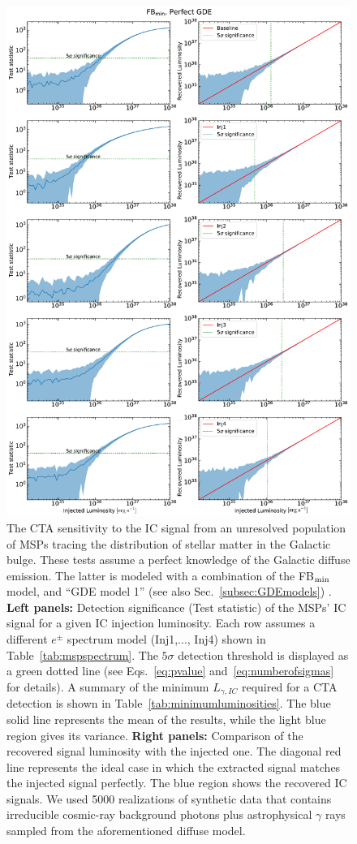 \documentclass[doublespace,draft,nopageskip]{VTthesis} %
\begin{document}
\begin{figure}
    \begin{center}
    \includegraphics[scale = 0.41]{Figures/CTA/all-TS-mis-False-Fermi-min-True.pdf}
    \caption{The CTA sensitivity to the IC signal from an unresolved population of MSPs tracing the distribution of stellar matter in the Galactic bulge. These tests assume a perfect knowledge of the Galactic diffuse emission. The latter is modeled with a combination of the FB$_{\rm min}$ model, and ``GDE model 1'' (see also Sec.~\ref{subsec:GDEmodels})  
    . \textbf{Left panels:} Detection significance (Test statistic) of the MSPs' IC signal for a given IC injection luminosity. Each row assumes a different $e^\pm$ spectrum model (Inj1,..., Inj4) shown in Table~\ref{tab:mspspectrum}. The $5\sigma$ detection threshold is displayed as a green dotted line (see Eqs.~\ref{eq:pvalue} and~\ref{eq:numberofsigmas} for details). A summary of the minimum $L_{\gamma,IC}$ required for a CTA detection is shown in Table~\ref{tab:minimumluminosities}.  The blue solid line represents the mean of the results, while the light blue region gives its variance. \textbf{Right panels:} Comparison of the recovered signal luminosity with the injected one. The diagonal red line represents the ideal case in which the extracted signal matches the injected signal perfectly. The blue region shows the recovered IC signals. We used  5000 realizations of synthetic data that contains irreducible cosmic-ray background photons plus astrophysical $\gamma$ rays sampled from the aforementioned diffuse model. 
}
\end{center}
\end{figure}
\end{document}
